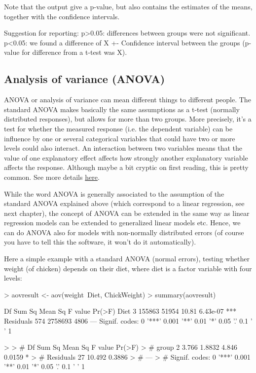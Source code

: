 \documentclass[a4paper,twoside]{tufte-book} %
\begin{document}
Note that the output give a p-value, but also contains the estimates of the means, together with the confidence intervals. 

Suggestion for reporting: p>0.05: differences between groups were not significant. p<0.05: we found a difference of X +- Confidence interval between the groups (p-value for difference from a t-test was X). 

\subsection{Analysis of variance (ANOVA)}

ANOVA or analysis of variance can mean different things to different people. The standard ANOVA makes basically the same assumptions as a t-test (normally distributed responses), but allows for more than two groups. More precisely, it's a test for whether the measured response (i.e. the dependent variable) can be influence by one or several categorical variables that could have two or more levels could also interact. An interaction between two variables means that the value of one explanatory effect affects how strongly another explanatory variable affects the response. Although maybe a bit cryptic on first reading, this is pretty common. See more details \href{biometry.github.io/APES/concepts/interaction.html}{here}.

While the word ANOVA is generally associated to the assumption of the standard ANOVA explained above (which correspond to a linear regression, see next chapter), the concept of ANOVA can be extended in the same way as linear regression models can be extended to generalized linear models etc. Hence, we can do ANOVA also for models with non-normally distributed errors (of course you have to tell this the software, it won't do it automatically). 

Here a simple example with a standard ANOVA (normal errors), testing whether weight (of chicken) depends on their diet, where diet is a factor variable with four levels:

\begin{Schunk}
\begin{Sinput}
> aovresult <- aov(weight~Diet, ChickWeight)
> summary(aovresult)
\end{Sinput}
\begin{Soutput}
             Df  Sum Sq Mean Sq F value   Pr(>F)    
Diet          3  155863   51954   10.81 6.43e-07 ***
Residuals   574 2758693    4806                     
---
Signif. codes:  0 '***' 0.001 '**' 0.01 '*' 0.05 '.' 0.1 ' ' 1
\end{Soutput}
\begin{Sinput}
> 
> # Df Sum Sq Mean Sq F value Pr(>F)  
> # group        2  3.766  1.8832   4.846 0.0159 *
> #   Residuals   27 10.492  0.3886                 
> # ---
> #   Signif. codes:  0 '***' 0.001 '**' 0.01 '*' 0.05 '.' 0.1 ' ' 1
\end{Sinput}
\end{Schunk}
\end{document}

